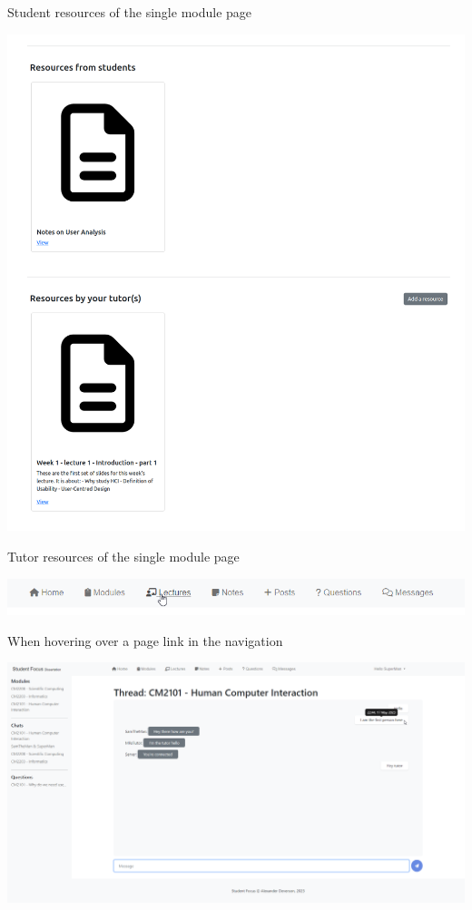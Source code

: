 Student resources of the single module page

\includegraphics[scale=0.27]{images/application/57 - tutor_resource.png}

Tutor resources of the single module page

\includegraphics[scale=0.50]{images/application/58 - nav_hover.png}

When hovering over a page link in the navigation

\includegraphics[scale=0.27]{images/application/59 - message_hover.png}

